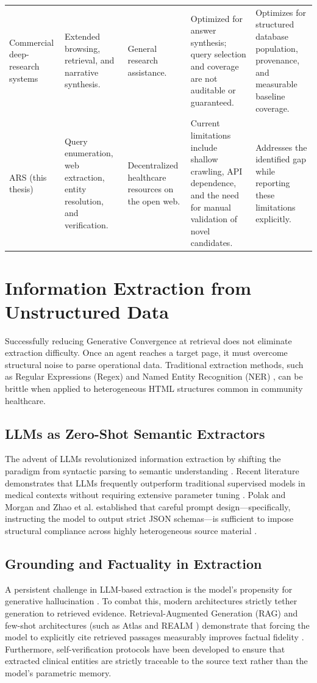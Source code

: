 \documentclass[12pt,oneside]{report}
\begin{document}
\begin{table}[htbp]
\begin{tabularx}{\textwidth}{@{}p{2.2cm} X X X X@{}}
Commercial deep-research systems \cite{21,22,23} & Extended browsing, retrieval, and narrative synthesis. & General research assistance. & Optimized for answer synthesis; query selection and coverage are not auditable or guaranteed. & Optimizes for structured database population, provenance, and measurable baseline coverage. \\
ARS (this thesis) & Query enumeration, web extraction, entity resolution, and verification. & Decentralized healthcare resources on the open web. & Current limitations include shallow crawling, API dependence, and the need for manual validation of novel candidates. & Addresses the identified gap while reporting these limitations explicitly. \\
\bottomrule
\end{tabularx}
\end{table}

\section{Information Extraction from Unstructured Data}
Successfully reducing Generative Convergence at retrieval does not eliminate extraction difficulty. Once an agent reaches a target page, it must overcome structural noise to parse operational data. Traditional extraction methods, such as Regular Expressions (Regex) and Named Entity Recognition (NER) \cite{26, 27}, can be brittle when applied to heterogeneous HTML structures common in community healthcare.

\subsection{LLMs as Zero-Shot Semantic Extractors}
The advent of LLMs revolutionized information extraction by shifting the paradigm from syntactic parsing to semantic understanding \cite{28, 29}. Recent literature demonstrates that LLMs frequently outperform traditional supervised models in medical contexts without requiring extensive parameter tuning \cite{30, 31, 32}. Polak and Morgan \cite{33} and Zhao et al. \cite{35} established that careful prompt design—specifically, instructing the model to output strict JSON schemas—is sufficient to impose structural compliance across highly heterogeneous source material \cite{34}.

\subsection{Grounding and Factuality in Extraction}
A persistent challenge in LLM-based extraction is the model's propensity for generative hallucination \cite{40}. To combat this, modern architectures strictly tether generation to retrieved evidence. Retrieval-Augmented Generation (RAG) \cite{36} and few-shot architectures (such as Atlas \cite{37} and REALM \cite{38}) demonstrate that forcing the model to explicitly cite retrieved passages measurably improves factual fidelity \cite{39}. Furthermore, self-verification protocols \cite{41, 42, 43} have been developed to ensure that extracted clinical entities are strictly traceable to the source text rather than the model's parametric memory.
\end{document}

